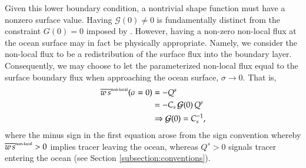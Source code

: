 Given this lower boundary condition, a nontrivial shape function must
have a nonzero surface value.  Having $\mathcal{G}(0) \ne 0$ is
fundamentally distinct from the constraint $G(0) = 0$ imposed by
\cite{LargeKPP}.  However, having a non-zero non-local flux at the
ocean surface may in fact be physically appropriate.  Namely, we
consider the non-local flux to be a redistribution of the surface flux
into the boundary layer.  Consequently, we may choose to let the
parameterized non-local flux equal to the surface boundary flux when
approaching the ocean surface, $\sigma \rightarrow 0$.  That is,
\begin{subequations}
\begin{align}
  \overline{w \, s}^{\mbox{\tiny non-local}} (\sigma=0) &= -Q^{s}   
 \\
  &= -C_{s} \, \mathcal{G}(0)\, Q^{s} 
 \\
 & \Rightarrow  \mathcal{G}(0) = C_{s}^{-1},
\end{align}
\end{subequations}
where the minus sign in the first equation arose from the sign
convention whereby $\overline{w \, s}^{\mbox{\tiny non-local}} > 0$
implies tracer leaving the ocean, whereas $Q^{s} > 0$ signals tracer
entering the ocean (see Section \ref{subsection:conventions}).  

